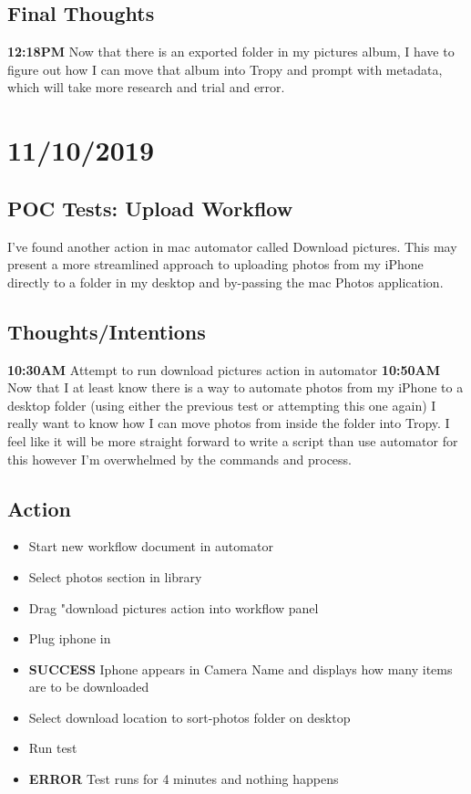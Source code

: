 \documentclass{article}
\begin{document}
\subsection{Final Thoughts}
\textbf{12:18PM} Now that there is an exported folder in my pictures album, I have to figure out how I can move that album into Tropy and prompt with metadata, which will take more research and trial and error.

\section{11/10/2019}
\subsection{POC Tests: Upload Workflow }
I've found another action in mac automator called Download pictures. This may present a more streamlined approach to uploading photos from my iPhone directly to a folder in my desktop and by-passing the mac Photos application.

\subsection{Thoughts/Intentions}
\textbf{10:30AM} Attempt to run download pictures action in automator
\textbf{10:50AM} Now that I at least know there is a way to automate photos from my iPhone to a desktop folder (using either the previous test or attempting this one again) I really want to know how I can move photos from inside the folder into Tropy. I feel like it will be more straight forward to write a script than use automator for this however I'm overwhelmed by the commands and process.

\subsection{Action}
\begin{itemize}
\item Start new workflow document in automator
\item Select photos section in library
\item Drag "download pictures action into workflow panel
\item Plug iphone in 
\item \textbf{SUCCESS} Iphone appears in Camera Name and displays how many items are to be downloaded
\item Select download location to sort-photos folder on desktop
\item Run test
\item \textbf{ERROR} Test runs for 4 minutes and nothing happens
\end{itemize}
\end{document}
